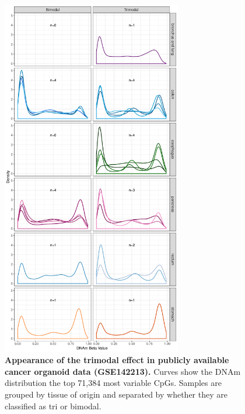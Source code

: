 \documentclass[a4paper]{article}
\begin{document}
\begin{figure}
\includegraphics[width=0.7\textwidth]{../figs/GSE144213_variable_CpGs.pdf}
\caption{\textbf{Appearance of the trimodal effect in publicly available cancer organoid data (GSE142213).} Curves show the DNAm distribution the top 71,384 most variable CpGs. Samples are grouped by tissue of origin and separated by whether they are classified as tri or bimodal. }
\end{figure}
\end{document}
